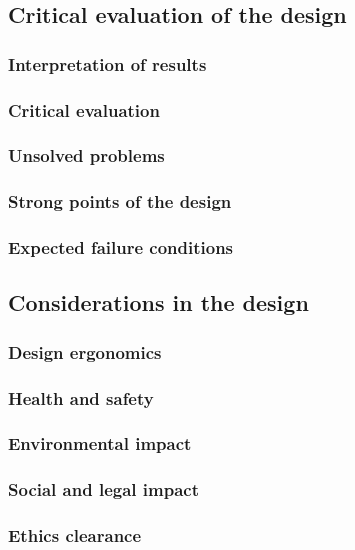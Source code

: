 
\subsection{Critical evaluation of the design} %

    \subsubsection{Interpretation of results}

        
    
    \subsubsection{Critical evaluation}
    
        
    
    \subsubsection{Unsolved problems}
    
        
    
    \subsubsection{Strong points of the design}
    
        
    
    \subsubsection{Expected failure conditions}

        
    
    
\subsection{Considerations in the design} %

    \subsubsection{Design ergonomics}
    
        
    
    \subsubsection{Health and safety}
    
        
    
    \subsubsection{Environmental impact}
    
        
    
    \subsubsection{Social and legal impact}
    
        
    
    \subsubsection{Ethics clearance}
    
        
    
    
